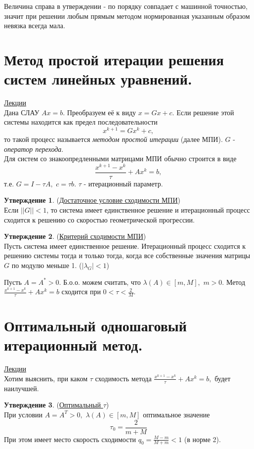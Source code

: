 \documentclass[specialist, subf, href, colorlinks=true, 12pt, times, mtpro, final]{disser}
\theoremstyle{definition}
\newtheorem{state}{Утверждение}[section]
\begin{document}
{   Величина справа в утверждении - по порядку совпадает с машинной точностью, значит при решении любым прямым методом нормированная указанным образом невязка всегда мала.


\section {Метод простой итерации решения систем линейных уравнений.}
    \hyperlink {lects.58}{Лекции}\\
    Дана СЛАУ $Ax = b$. Преобразуем её к виду $x = Gx + c$. Если решение этой системы находится как предел последовательности
    $$
        x^{k+1} = Gx^{k} + c,
    $$
    то такой процесс называется {\it методом простой итерации} (далее МПИ). $G$ - {\it оператор перехода}.\\
    Для систем со знакоопредленными матрицами МПИ обычно строится в виде
    $$
        \frac{x^{k+1} - x^{k}}{\tau} + Ax^{k} = b,
    $$
    т.е. $G = I - \tau A, \,\, c = \tau b$. $\tau$ - итерационный параметр.
    \begin{state} (\hyperlink {lects.58}{Достаточное условие сходимости МПИ})\\
    Если $||G|| < 1$, то система имеет единственное решение и итерационный процесс сходится
    к решению со скоростью геометрической прогрессии.
    \end{state}
    \begin{state} (\hyperlink {lects.59}{Критерий сходимости МПИ})\\
    Пусть система имеет единственное решение. Итерационный процесс сходится к решению системы тогда и только тогда, когда все собственные значения матрицы $G$ по модулю меньше 1. ($|\lambda_{G}| < 1$)
    \end{state}
    Пусть $A = A^* > 0$. Б.о.о. можем считать, что $\lambda(A) \in [m, M],\,\, m > 0$.
    Метод $ \frac{x^{k+1} - x^{k}}{\tau} + Ax^{k} = b$ сходится при $0 < \tau < \frac{2}{M}$.

\section {Оптимальный одношаговый итерационный метод.}
    \hyperlink {lects.60}{Лекции}\\
    Хотим выяснить, при каком $\tau$ сходимость метода
    $\frac{x^{k+1} - x^{k}}{\tau} + Ax^{k} = b,$ будет наилучшей.
    \begin{state} (\hyperlink {lects.60}{Оптимальный $\tau$})\\
    При условии $A = A^T > 0, \,\, \lambda(A) \in [m, M]$ оптимальное значение
    $$\tau_0 = \frac{2}{m+M}$$
    При этом имеет место скорость сходимости $q_0 = \frac{M-m}{M+m} < 1$ (в норме 2).
    \end{state}

}
\end{document}
